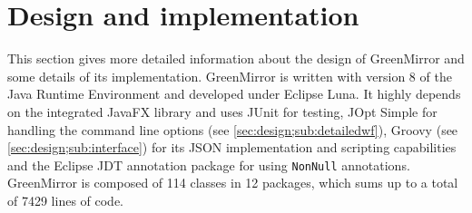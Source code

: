 \section{Design and implementation}\label{sec:design}
This section gives more detailed information about the design of GreenMirror and some details of its implementation. GreenMirror is written with version 8 of the Java Runtime Environment and developed under Eclipse Luna. It highly depends on the integrated JavaFX library and uses JUnit \cite{junit} for testing, JOpt Simple \cite{joptsimple} for handling the command line options (see \cref{sec:design;sub:detailedwf}), Groovy \cite{groovy} (see \cref{sec:design;sub:interface}) for its JSON implementation and scripting capabilities and the Eclipse JDT annotation package for using \lstinline{NonNull} annotations. GreenMirror is composed of 114 classes in 12 packages, which sums up to a total of 7429 lines of code.
